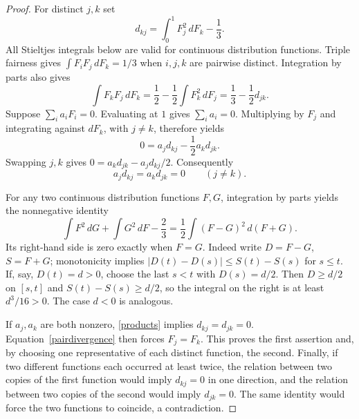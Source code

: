 \documentclass[11pt]{article}
\begin{document}
\begin{proof}
For distinct $j,k$ set
\[
 d_{kj}=\int_0^1 F_j^2\,dF_k-\frac13.
\]
All Stieltjes integrals below are valid for continuous distribution
functions. Triple fairness gives
$\int F_iF_j\,dF_k=1/3$ when $i,j,k$ are pairwise distinct.
Integration by parts also gives
\[
 \int F_kF_j\,dF_k=\frac12-\frac12\int F_k^2\,dF_j
 =\frac13-\frac12d_{jk}.
\]
Suppose $\sum_i a_iF_i=0$. Evaluating at $1$ gives $\sum_i a_i=0$.
Multiplying by $F_j$ and integrating against $dF_k$, with $j\ne k$,
therefore yields
\[
 0=a_jd_{kj}-\frac12a_kd_{jk}.
\]
Swapping $j,k$ gives $0=a_kd_{jk}-a_jd_{kj}/2$. Consequently
\begin{equation}\label{products}
 a_jd_{kj}=a_kd_{jk}=0\qquad(j\ne k).
\end{equation}

For any two continuous distribution functions $F,G$, integration by
parts yields the nonnegative identity
\begin{equation}\label{pairdivergence}
 \int F^2\,dG+\int G^2\,dF-\frac23
   =\frac12\int(F-G)^2\,d(F+G).
\end{equation}
Its right-hand side is zero exactly when $F=G$.
Indeed write $D=F-G$, $S=F+G$; monotonicity implies
$|D(t)-D(s)|\le S(t)-S(s)$ for $s\le t$.
If, say, $D(t)=d>0$, choose the last $s<t$ with $D(s)=d/2$.
Then $D\ge d/2$ on $[s,t]$ and $S(t)-S(s)\ge d/2$, so the integral
on the right is at least $d^3/16>0$. The case $d<0$ is analogous.

If $a_j,a_k$ are both nonzero, \eqref{products} implies
$d_{kj}=d_{jk}=0$. Equation~\eqref{pairdivergence} then forces $F_j=F_k$.
This proves the first assertion and, by choosing one representative of
each distinct function, the second.
Finally, if two different functions each occurred at least twice, the
relation between two copies of the first function would imply
$d_{kj}=0$ in one direction, and the relation between two copies of the
second would imply $d_{jk}=0$. The same identity would force the two
functions to coincide, a contradiction.
\end{proof}
\end{document}
